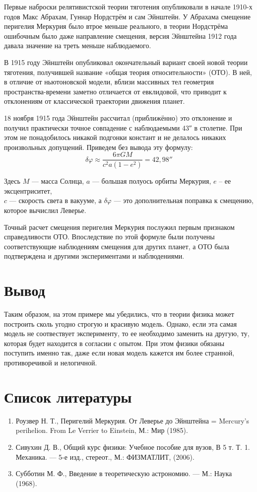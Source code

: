 \documentclass[12pt]{article}
\begin{document}
Первые наброски релятивистской теории тяготения опубликовали в начале 1910-х годов Макс Абрахам, Гуннар Нордстрём и сам Эйнштейн. У Абрахама смещение перигелия Меркурия было втрое меньше реального, в теории Нордстрёма ошибочным было даже направление смещения, версия Эйнштейна 1912 года давала значение на треть меньше наблюдаемого.

В 1915 году Эйнштейн опубликовал окончательный вариант своей новой теории тяготения, получившей название «общая теория относительности» (ОТО). В ней, в отличие от ньютоновской модели, вблизи массивных тел геометрия пространства-времени заметно отличается от евклидовой, что приводит к отклонениям от классической траектории движения планет.

18 ноября 1915 года Эйнштейн рассчитал (приближённо) это отклонение и получил практически точное совпадение с наблюдаемыми 43″ в столетие. При этом не понадобилось никакой подгонки констант и не делалось никаких произвольных допущений. Приведем без вывода эту формулу: 
\begin{equation}
\delta\varphi \approx \dfrac{6\pi GM}{c^2a(1-e^2)} = 42,98''
\end{equation}

Здесь $ M $ --- масса Солнца, $ a $ --- большая полуось орбиты Меркурия, $ e $ -- ее эксцентриситет,\\ $ c $ --- скорость света в вакууме,  а $ \delta\varphi $ --- это дополнительная поправка к смещению, которое вычислил Леверье.

Точный расчет смещения перигелия Меркурия послужил первым признаком справедливости ОТО. Впоследствие по этой формуле были получены соответствующие наблюдениям смещения для других планет, а ОТО была подтверждена и другими экспериментами и наблюдениями.  

\section{Вывод}

Таким образом, на этом примере мы убедились, что в теории физика может построить сколь угодно строгую и красивую модель. Однако, если эта самая модель не соотвествует эксперименту, то ее необходимо заменить на другую, ту, которая будет находится в согласии с опытом. При этом физики обязаны поступить именно так, даже если новая модель кажется им более странной, противоречивой и нелогичной.

\section*{Список литературы} \large
\begin{enumerate}
  \item Роузвер Н. Т., Перигелий Меркурия. От Леверье до Эйнштейна = Mercury's perihelion. From Le Verrier to Einstein, М.: Мир (1985).
  \item Сивухин Д. В., Общий курс физики: Учебное пособие для вузов, В 5 т. Т. 1. Механика. --- 5-е изд., стереот., М.: ФИЗМАТЛИТ, (2006).
  \item Субботин М. Ф., Введение в теоретическую астрономию. — М.: Наука (1968).
  \end{enumerate}
\end{document}
